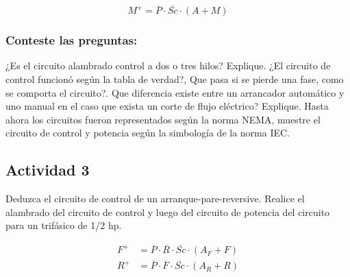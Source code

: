 \newpage

\begin{equation*}
    M^+ = \overline{P} \cdot \overline{Sc} \cdot (A+M)
\end{equation*}

 \begin{figure}[H]
    \centering
 \end{figure}

 
\subsubsection{Conteste las preguntas:}

¿Es el circuito alambrado control a dos o tres hilos? Explique. ¿El circuito de control funcionó según la tabla de verdad?, Que pasa si se pierde una fase, como se comporta el circuito?. Que diferencia existe entre un arrancador automático y uno manual en el caso que exista un corte de flujo eléctrico? Explique.
 Hasta ahora los circuitos fueron representados según la norma NEMA, muestre el circuito de control y potencia según la simbología de la norma IEC.

\subsection{Actividad 3}

Deduzca el circuito de control de un arranque-pare-reversive. Realice el alambrado del circuito de control y luego del circuito de potencia del circuito para un trifásico de 1/2 hp.


 \begin{align*}
    F^+ &= \overline{P} \cdot \overline{R} \cdot \overline{Sc} \cdot (A_F + F) \\
    R^+ &= \overline{P} \cdot \overline{F} \cdot \overline{Sc} \cdot (A_R + R)
 \end{align*}

